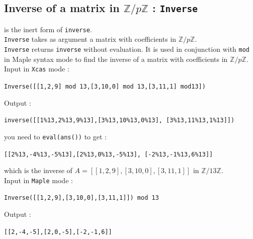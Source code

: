 \documentclass[a4paper,11pt]{book}
\newcommand{\Z}{{\mathbb{Z}}}
\begin{document}
\subsection{Inverse of a matrix in $\Z/p\Z$ : {\tt Inverse}}
   is the inert form of {\tt inverse}.\\
{\tt Inverse} takes as argument a matrix with coefficients in $\Z/p\Z$.\\
{\tt Inverse} returns {\tt inverse} without evaluation. 
It is used in conjunction with {\tt mod} in Maple syntax mode to 
find the inverse of a matrix with coefficients in $\Z/p\Z$.\\
Input in {\tt Xcas} mode :
\begin{center}{\tt Inverse([[1,2,9] mod 13,[3,10,0] mod 13,[3,11,1] mod13])}\end{center} 
Output :
\begin{center}{\tt inverse([[1\%13,2\%13,9\%13],[3\%13,10\%13,0\%13], [3\%13,11\%13,1\%13]])}\end{center} 
you need to {\tt eval(ans())} to get :
\begin{center}{\tt [[2\%13,-4\%13,-5\%13],[2\%13,0\%13,-5\%13], [-2\%13,-1\%13,6\%13]]}\end{center} 
which is the inverse of $A=[[1,2,9],[3,10,0],[3,11,1]]$ in $\Z/13\Z$.\\
Input in {\tt Maple} mode :
\begin{center}{\tt Inverse([[1,2,9],[3,10,0],[3,11,1]]) mod 13}\end{center}
Output :
\begin{center}{\tt [[2,-4,-5],[2,0,-5],[-2,-1,6]]}\end{center}
\end{document}
